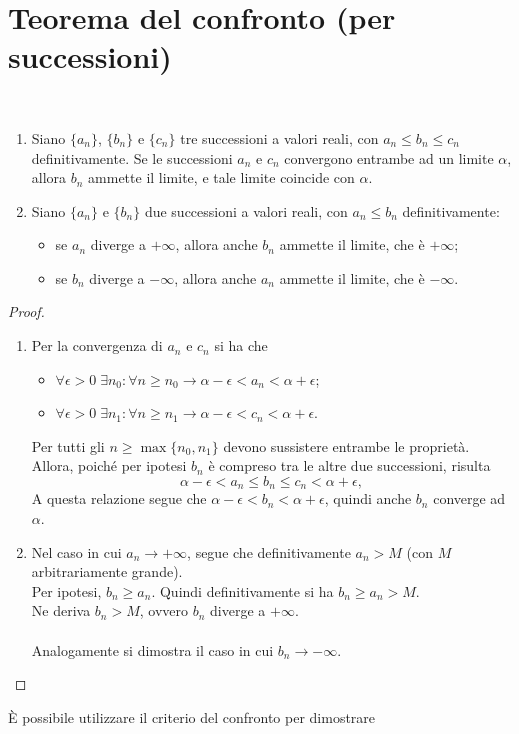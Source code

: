 \documentclass[a4paper,12pt, oneside]{book}
\begin{document}
\section{Teorema del confronto (per successioni)}
\begin{teorema} \
  \begin{enumerate}
    \item Siano $\{a_n\}$, $\{b_n\}$ e $\{c_n\}$ tre successioni a valori reali,
    con $a_n\leq b_n\leq c_n$ definitivamente. Se le successioni $a_n$ e $c_n$
    convergono entrambe ad un limite $\alpha$, allora $b_n$ ammette il limite, e
    tale limite coincide con $\alpha$.
    \item Siano $\{a_n\}$ e $\{b_n\}$ due successioni a valori reali, con
    $a_n\leq b_n$ definitivamente:
    \begin{itemize}
      \item se $a_n$ diverge a $+\infty$, allora anche $b_n$ ammette il limite,
      che è $+\infty$;
      \item se $b_n$ diverge a $-\infty$, allora anche $a_n$ ammette il limite,
      che è $-\infty$.
    \end{itemize}
  \end{enumerate}
\end{teorema}
\begin{proof}\
  \begin{enumerate}
    \item Per la convergenza di $a_n$ e $c_n$ si ha che
    \begin{itemize}
      \item $\forall\epsilon>0\;\exists n_0\colon\forall n\geq
      n_0\to\alpha-\epsilon<a_n<\alpha+\epsilon$;
      \item $\forall\epsilon>0\;\exists n_1\colon\forall n\geq
      n_1\to\alpha-\epsilon<c_n<\alpha+\epsilon$.
    \end{itemize} Per tutti gli $n\geq\max\{n_0,n_1\}$ devono sussistere
    entrambe le proprietà. Allora, poiché per ipotesi $b_n$ è compreso tra le altre
    due successioni, risulta
    \[ \alpha-\epsilon<a_n\leq b_n\leq c_n<\alpha+\epsilon,
    \] A questa relazione segue che $\alpha-\epsilon<b_n<\alpha+\epsilon$,
    quindi anche $b_n$ converge ad $\alpha$.
    \item Nel caso in cui $a_n\to +\infty$, segue che definitivamente $a_n>M$
    (con $M$ arbitrariamente grande).\\ Per ipotesi, $b_n\geq a_n$. Quindi
    definitivamente si ha $b_n\geq a_n>M$.\\ Ne deriva $b_n>M$, ovvero $b_n$ diverge
    a $+\infty$.\\\\ Analogamente si dimostra il caso in cui $b_n\to
    -\infty$.\qedhere
  \end{enumerate}
\end{proof} È possibile utilizzare il criterio del confronto per dimostrare
\end{document}
